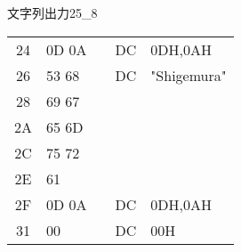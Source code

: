 \begin{reidai}{文字列出力2}{5_8}
\begin{description}
{\begin{center}
\begin{tabular}{|c|l|l|l l|}
        24 &  0D 0A  &        &  DC     & 0DH,0AH        \\
        26 &  53 68  &        &  DC     & "Shigemura"    \\
        28 &  69 67  &        &         &                \\
        2A &  65 6D  &        &         &                \\
        2C &  75 72  &        &         &                \\
        2E &  61     &        &         &                \\
        2F &  0D 0A  &        &  DC     & 0DH,0AH        \\
        31 &  00     &        &  DC     & 00H            \\
        \hline
      \end{tabular}
    \end{center}}
  \end{description}
\end{reidai}


